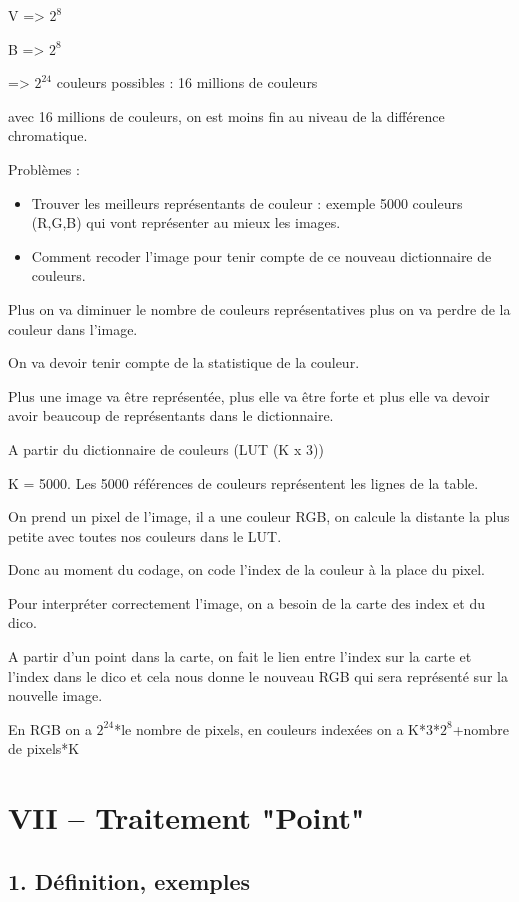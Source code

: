\documentclass{report}
\begin{document}
V => $2^{8}$

B => $2^{8}$

=> $2^{24}$ couleurs possibles : 16 millions de couleurs

avec 16 millions de couleurs, on est moins fin au niveau de la différence chromatique.

Problèmes :
	\begin{itemize}\renewcommand{\labelitemi}{$\bullet$}
	\item Trouver les meilleurs représentants de couleur : exemple 5000 couleurs (R,G,B) qui vont représenter au mieux les images.
	\item Comment recoder l'image pour tenir compte de ce nouveau dictionnaire de couleurs.
	\end{itemize}

Plus on va diminuer le nombre de couleurs représentatives plus on va perdre de la couleur dans l'image.

On va devoir tenir compte de la statistique de la couleur.

Plus une image va être représentée, plus elle va être forte et plus elle va devoir avoir beaucoup de représentants dans le dictionnaire.

A partir du dictionnaire de couleurs (LUT (K x 3))

K = 5000. Les 5000 références de couleurs représentent les lignes de la table.

On prend un pixel de l'image, il a une couleur RGB, on calcule la distante la plus petite avec toutes nos couleurs dans le LUT.

Donc au moment du codage, on code l'index de la couleur à la place du pixel.

Pour interpréter correctement l'image, on a besoin de la carte des index et du dico. 

A partir d'un point dans la carte, on fait le lien entre l'index sur la carte et l'index dans le dico et cela nous donne le nouveau RGB qui sera représenté sur la nouvelle image.

En RGB on a $2^{24}$*le nombre de pixels, en couleurs indexées on a K*3*$2^{8}$+nombre de pixels*K


\section*{VII – Traitement "Point"}

	\subsection*{1. Définition, exemples}
\end{document}
